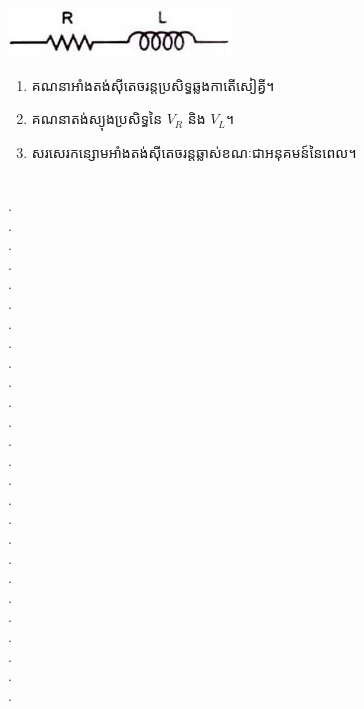 \documentclass{officialexam}
\begin{document}
\begin{enumerate}[I]
	\begin{multicols}{2}
		\includegraphics[scale=1.3]{image15}
		\begin{enumerate}[k]
			\item គណនាអាំងតង់សុីតេចរន្តប្រសិទ្ធឆ្លងកាតើសៀគ្វី។
			\item គណនាតង់ស្យុងប្រសិទ្ធនៃ $V_{R}$ និង $V_{L}$។
			\item សរសេរកន្សោមអាំងតង់សុីតេចរន្តឆ្លាស់ខណៈជាអនុគមន៍នៃពេល។
		\end{enumerate}
	\end{multicols}
\end{enumerate}
\\
{\color{white}.}\dotfill\\
{\color{white}.}\dotfill\\
{\color{white}.}\dotfill
\\
{\color{white}.}\dotfill\\
{\color{white}.}\dotfill\\
{\color{white}.}\dotfill
\\
{\color{white}.}\dotfill\\
{\color{white}.}\dotfill\\
{\color{white}.}\dotfill
\\
{\color{white}.}\dotfill\\
{\color{white}.}\dotfill\\
{\color{white}.}\dotfill
\\
{\color{white}.}\dotfill\\
{\color{white}.}\dotfill\\
{\color{white}.}\dotfill
\\
{\color{white}.}\dotfill\\
{\color{white}.}\dotfill\\
{\color{white}.}\dotfill
\\
{\color{white}.}\dotfill\\
{\color{white}.}\dotfill\\
{\color{white}.}\dotfill
\\
{\color{white}.}\dotfill\\
{\color{white}.}\dotfill\\
{\color{white}.}\dotfill
\\
{\color{white}.}\dotfill\\
{\color{white}.}\dotfill\\
\end{document}
